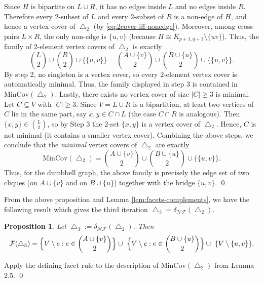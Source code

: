 \documentclass[12pt]{article}
\renewenvironment{proof}{{\noindent\bfseries Proof.}}{\qed}
\theoremstyle{plain}
\newtheorem{proposition}[theorem]{Proposition}
\theoremstyle{definition}
\newcommand{\F}{\mathcal{F}}
\newcommand{\MIN}{\mathrm{MinCov}}
\newcommand{\V}{V}
\begin{document}
\begin{proof}
			Since \(H\) is bipartite on \(L\cup R\), it has  no edges inside \(L\) and no edges inside \(R\).
			Therefore every \(2\)-subset of \(L\) and every \(2\)-subset of \(R\) is a non-edge of \(H\),
			and hence  a vertex cover of \(\bigtriangleup_2\) (by \eqref{eq:2cover-iff-nonedge}).
			Moreover, among cross pairs \(L\times R\), the only non-edge is \(\{u,v\}\) (because \(H\cong K_{p+1,q+1}\setminus\{uv\}\)).
			Thus, the family of \(2\)-element vertex covers of \(\bigtriangleup_2\) is exactly
			\[
			\binom{L}{2} \cup \binom{R}{2} \cup \{\{u,v\}\}
			=
			\binom{A\cup\{v\}}{2} \cup \binom{B\cup\{u\}}{2} \cup \{\{u,v\}\}.
			\]
			By step 2, no singleton is a vertex cover, so every \(2\)-element vertex cover is automatically minimal.
			Thus, the family displayed in step 3 is contained in \(\MIN(\bigtriangleup_2)\). Lastly, there exists no vertex cover of size \(|C|\ge 3\) is minimal. 
			Let \(C\subseteq V\) with \(|C|\ge 3\). Since \(V=L\cup R\) is a bipartition, at least two vertices of \(C\) lie in the same part,
			say \(x,y\in C\cap L\) (the case \(C\cap R\) is analogous). Then \(\{x,y\}\in \binom{L}{2}\), so by Step 3
			the \(2\)-set \(\{x,y\}\) is a vertex cover of \(\bigtriangleup_2\).
			Hence, \(C\) is not minimal (it contains a smaller vertex cover). Combining the above steps, we conclude that the \emph{minimal} vertex covers of \(\bigtriangleup_2\) are exactly
			\[
			\MIN(\bigtriangleup_2)=\binom{A\cup\{v\}}{2} \cup \binom{B\cup\{u\}}{2} \cup \{\{u,v\}\}.
			\]
			Thus, for the dumbbell graph, the above family is precisely the edge set of two cliques
			(on \(A\cup\{v\}\) and on \(B\cup\{u\}\)) together with the bridge \(\{u,v\}\).
		\end{proof}
		
		\medskip
		From the above proposition and Lemma \ref{lem:facets-complements}, we have the following result which gives the third iteration  \(\bigtriangleup_3=\delta_{\mathcal{NF}}(\bigtriangleup_2)\).
		\begin{proposition}
			Let \(\bigtriangleup_3:=\delta_{\mathcal{NF}}(\bigtriangleup_2)\). Then
			\[
			\F(\bigtriangleup_3)=
			\Bigl\{\V\setminus e : e\in \binom{A\cup\{v\}}{2}\Bigr\}
			 \cup\
			\Bigl\{\V\setminus e : e\in \binom{B\cup\{u\}}{2}\Bigr\}
			 \cup\
			\{\V\setminus\{u,v\}\}.
			\]
		\end{proposition}
		
		\begin{proof}
			Apply the defining facet rule to the description of \(\MIN(\bigtriangleup_2)\) from Lemma 2.5.
		\end{proof}
		
\end{document}
